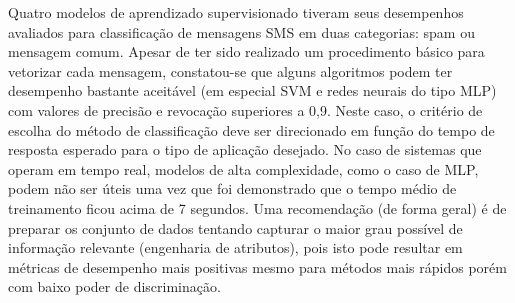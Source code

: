 \documentclass[a4paper,11pt]{article}
\begin{document}
Quatro modelos de aprendizado supervisionado tiveram seus desempenhos avaliados para classificação
de mensagens SMS em duas categorias: spam ou mensagem comum. Apesar de ter sido realizado um 
procedimento básico para vetorizar cada mensagem, constatou-se que alguns algoritmos podem ter 
desempenho bastante aceitável (em especial SVM e redes neurais do tipo MLP) com valores de 
precisão e revocação superiores a 0,9. Neste caso, o critério de escolha do método de classificação 
deve ser direcionado em função do tempo de resposta esperado para o tipo de aplicação desejado. 
No caso de sistemas que operam em tempo real, modelos de alta complexidade, como o caso de MLP,
podem não ser úteis uma vez que foi demonstrado que o tempo médio de treinamento ficou acima de 
7 segundos. Uma recomendação (de forma geral) é de preparar os conjunto de dados tentando capturar 
o maior grau possível de informação relevante (engenharia de atributos), pois isto pode resultar
em métricas de desempenho mais positivas mesmo para métodos mais rápidos porém com baixo poder de 
discriminação.




% 

 






 
\end{document}
